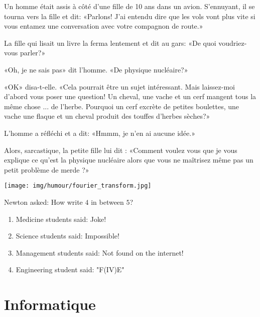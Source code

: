 Un homme était assis à côté d'une fille de 10 ans dans un avion. S'ennuyant, il se tourna vers la fille et dit: «Parlons! J'ai entendu dire que les vols vont plus vite si vous entamez une conversation avec votre compagnon de route.»

La fille qui lisait un livre la ferma lentement et dit au gars: «De quoi voudriez-vous parler?»

«Oh, je ne sais pas» dit l'homme. «De physique nucléaire?»

«OK» disa-t-elle. «Cela pourrait être un sujet intéressant. Mais laissez-moi d'abord vous poser une question! Un cheval, une vache et un cerf mangent tous la même chose ... de l'herbe. Pourquoi un cerf excrète de petites boulettes, une vache une flaque et un cheval produit des touffes d'herbes sèches?»

L'homme a réfléchi et a dit: «Hmmm, je n'en ai aucune idée.»

Alors, sarcastique, la petite fille lui dit : «Comment voulez vous que je vous explique ce qu'est la physique nucléaire alors que vous ne maîtrisez même pas un petit problème de merde ?»

\begin{center}\underline{\hspace{5 cm}}\end{center}

	\begin{center}
	\texttt{[image: img/humour/fourier\_transform.jpg]}
	\end{center}
	
\begin{center}\underline{\hspace{5 cm}}\end{center}

Newton asked: How write $4$ in between $5$?

\begin{enumerate}
	\item Medicine students said: Joke!
	
	\item Science students said: Impossible!
	
	\item Management students said: Not found on the internet!
	
	\item Engineering student said: "F(IV)E"
\end{enumerate}

	\pagebreak
	\section{Informatique}

